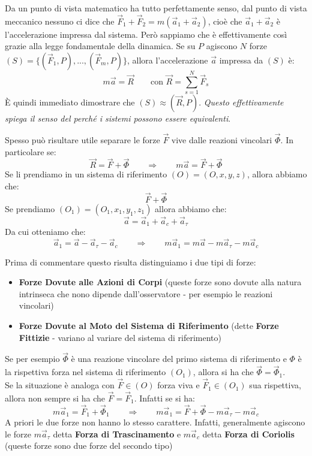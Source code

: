 \documentclass[11pt,a4paper,twoside]{article}
\theoremstyle{definition}
\begin{document}
Da un punto di vista matematico ha tutto perfettamente senso, dal punto di vista meccanico nessuno ci dice che $\vec F_1 + \vec F_2 = m(\vec a_1 + \vec a_2)$, cioè che $\vec a_1 + \vec a_2$ è l'accelerazione impressa dal sistema. Però sappiamo che è effettivamente così grazie alla legge fondamentale della dinamica.
Se su $P$ agiscono $N$ forze $(S) = \{ (\vec F_1, P),..., (\vec F_m, P)\}$, allora l'accelerazione $\vec a$ impressa da $(S)$ è:
\[ m\vec a = \vec R \qquad \text{con } \vec R = \sum_{s = 1}^N \vec F_s\]
È quindi immediato dimostrare che $(S) \approx (\vec R, P)$. \textit{Questo effettivamente spiega il senso del perché i sistemi possono essere equivalenti}.

Spesso può risultare utile separare le forze $\vec F$ vive dalle reazioni vincolari $\vec \Phi$. In particolare se:
\[ \vec R = \vec F + \vec \Phi \qquad \Rightarrow \qquad m\vec a = \vec F + \vec \Phi \]
Se li prendiamo in un sistema di riferimento $(O) = (O, x, y, z)$, allora abbiamo che:
\[ \vec F + \vec \Phi \]
Se prendiamo $(O_1)= (O_1, x_1, y_1, z_1)$ allora abbiamo che:
\[ \vec a = \vec a_1 + \vec a_c + \vec a_\tau \]
Da cui otteniamo che:
\[ \vec a_1 = \vec a - \vec a_\tau - \vec a_c \qquad \Rightarrow \qquad m\vec a_1 = m \vec a - m\vec a_\tau - m\vec a_c \]

Prima di commentare questo risulta distinguiamo i due tipi di forze:
\begin{itemize}
	\item \textbf{Forze Dovute alle Azioni di Corpi} (queste forze sono dovute alla natura intrinseca che nono dipende dall'osservatore - per esempio le reazioni vincolari)
	\item \textbf{Forze Dovute al Moto del Sistema di Riferimento}  (dette \textbf{Forze Fittizie} - variano al variare del sistema di riferimento)
\end{itemize}

Se per esempio $\vec \Phi$ è una reazione vincolare del primo sistema di riferimento e $\Phi$ è la rispettiva forza nel sistema di riferimento $(O_1)$, allora si ha che $\vec \Phi = \vec \Phi_1$.\\
Se la situazione è analoga con $\vec F \in (O)$ forza viva e $\vec F_1 \in (O_1)$ sua rispettiva, allora non sempre si ha che $\vec F = \vec F_1$. Infatti se si ha:
\[ m \vec a_1 = \vec F_1 + \vec \Phi_1 \qquad \Rightarrow \qquad m\vec a_1 = \vec F + \vec \Phi - m \vec a_\tau - m \vec a_c \]
A priori le due forze non hanno lo stesso carattere. Infatti, generalmente agiscono le forze $m\vec a_\tau$ detta \textbf{Forza di Trascinamento} e $m\vec a_c$ detta \textbf{Forza di Coriolis} (queste forze sono due forze del secondo tipo)
\end{document}
